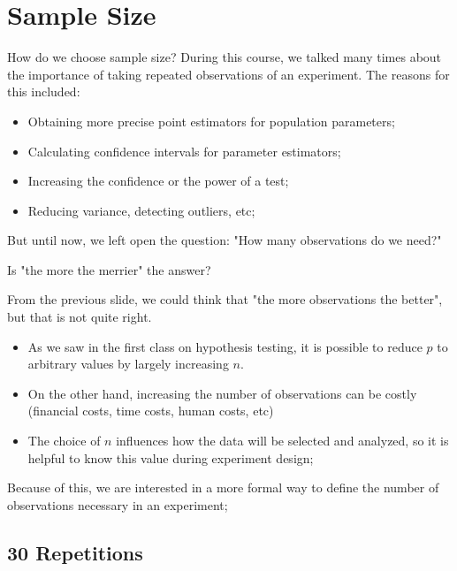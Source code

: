 \section{Sample Size}

\begin{frame}{How do we choose sample size?}
  During this course, we talked many times about the importance of taking repeated observations of an experiment. The reasons for this included:\bigskip

  \begin{itemize}
    \item Obtaining more precise point estimators for population parameters;
    \item Calculating confidence intervals for parameter estimators;
    \item Increasing the confidence or the power of a test;
    \item Reducing variance, detecting outliers, etc;
  \end{itemize}\bigskip

But until now, we left open the question: "How many observations do we need?"
\end{frame}

\begin{frame}{Is "the more the merrier" the answer?}

  From the previous slide, we could think that "the more observations the better", but that is not quite right.\bigskip

  \begin{itemize}
    \item As we saw in the first class on hypothesis testing, it is possible to
    reduce $p$ to arbitrary values by largely increasing $n$.\bigskip

    \item On the other hand, increasing the number of observations can be costly (financial costs, time costs, human costs, etc)\bigskip

    \item The choice of $n$ influences how the data will be selected and analyzed, so it is helpful to know this value during experiment design;
  \end{itemize}\bigskip

  Because of this, we are interested in a more formal way to define the number of observations necessary in an experiment;
\end{frame}


\subsection{30 Repetitions}

